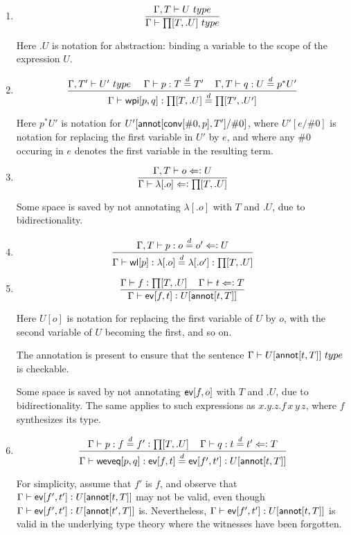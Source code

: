 \documentclass[11pt]{article}
\newcommand{\eqd}{\stackrel{d}{=}}
\newcommand{\spc}{{\,\,\,\,\,\,\,}}
\newcommand{\synth}{\vcentcolon} %
\newcommand{\ccheck}{\Leftarrow\vcentcolon}
\newcommand{\Type}{\mathop{{\, \sc type}}}
\newcommand{\ha}[2]{#1[#2]}
\newcommand{\annot}{{\sf annot}}
\newcommand{\conv}{{\sf conv}}
\newcommand{\ev}{{\sf ev}}
\newcommand{\weveq}{{\sf weveq}}
\newcommand{\wl}{{\sf wl}}
\newcommand{\wpi}{{\sf wpi}}
\begin{document}
\begin{enumerate}

\item 
$$\frac{\Gamma, T\vdash U\Type}{\Gamma\vdash \ha\prod{T,.U}\Type}$$

Here $.U$ is notation for abstraction: binding a variable to the scope of the expression $U$.

\item 
$$ \frac{ 
  \Gamma, T' \vdash U'  \Type      \spc 
  \Gamma     \vdash p:T \eqd T'    \spc
  \Gamma, T  \vdash q:U \eqd p^*U'
  } {
  \Gamma     \vdash \ha\wpi{p,q}:\ha\prod{T,.U}\eqd \ha\prod{T',.U'}
}$$

Here ${p}^*U'$ is notation for $U'[\ha\annot{\ha\conv{\#0,p},T'}/\#0]$, where
$U'[e/\#0]$ is notation for replacing the first variable in $U'$ by $e$, and
where any $\#0$ occuring in $e$ denotes the first variable in the resulting
term.

\item 
$$\frac{\Gamma, T\vdash o \ccheck U}{\Gamma\vdash \ha\lambda{.o} \ccheck \ha\prod{T,.U}}$$

Some space is saved by not annotating $\ha\lambda{.o}$ with $T$ and $.U$, due to bidirectionality.

\item 
$$\frac{\Gamma, T\vdash p : o\eqd o' \ccheck U}{\Gamma\vdash \ha\wl{p} : \ha\lambda{.o}\eqd \ha\lambda{.o'} : \ha\prod{T,.U}}$$

\item 
$$\frac{\Gamma\vdash f \synth \ha\prod{T,.U}\spc \Gamma\vdash t \ccheck T}{\Gamma\vdash \ha\ev{f,t} \synth U[\ha\annot{t,T}]}$$

Here $U[o]$ is notation for replacing the first variable of $U$ by $o$, with
the second variable of $U$ becoming the first, and so on.  

The annotation is present to ensure that the sentence $\Gamma \vdash
U[\ha\annot{t,T}] \Type$ is checkable.

Some space is saved by not annotating $\ha\ev{f,o}$ with $T$ and $.U$, due to
bidirectionality.  The same applies to such expressions as $x.y.z.f\, x\, y\,
z$, where $f$ synthesizes its type.

\item 
$$\frac{
   \Gamma\vdash p : f \eqd f' \synth \ha\prod{T,.U}\spc 
   \Gamma\vdash q : t \eqd t' \ccheck T
   }{
   \Gamma\vdash \ha\weveq{p,q} : \ha\ev{f,t} \eqd \ha\ev{f',t'} \synth U[\ha\annot{t,T}]
  }$$

For simplicity, assume that $f'$ is $f$, and observe that $\Gamma \vdash
\ha\ev{f',t'} \synth U[\ha\annot{t,T}]$ may not be valid, even though $\Gamma
\vdash \ha\ev{f',t'} \synth U[\ha\annot{t',T}]$ is.  Nevertheless, $\Gamma \vdash
\ha\ev{f',t'} : U[\ha\annot{t,T}]$ is valid in the underlying type theory where
the witnesses have been forgotten.


\end{enumerate}
\end{document}
